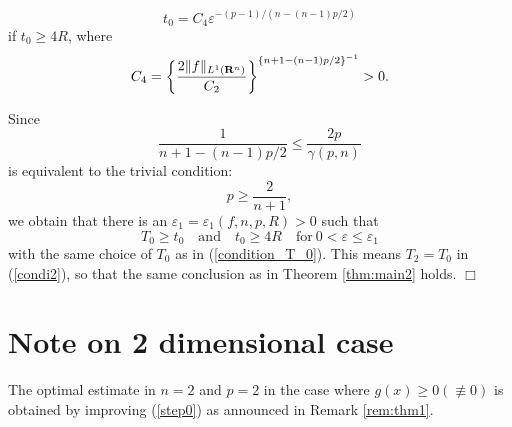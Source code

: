\documentclass[a4paper,12pt]{article}
\numberwithin{equation}{section}
\def\R{{\bf R}}
\def\e{{\varepsilon}}
\begin{document}
\begin{equation}
\label{t_0}
t_0=C_4\e^{-(p-1)/(n-(n-1)p/2)}
\end{equation}
if $t_0\ge4R$, where
\[
C_4=\left\{
\frac{2\|f\|_{L^1(\R^n)}}{C_2}
\right\}^{\left\{n+1-(n-1)p/2\right\}^{-1}}>0.
\]
\par
Since
\[
\frac{1}{n+1-(n-1)p/2}\le\frac{2p}{\gamma(p,n)}
\]
is equivalent to the trivial condition:
\[
p\ge\frac{2}{n+1},
\]
we obtain that there is an $\e_1=\e_1(f,n,p,R)>0$ such that
\[
T_0\ge t_0\quad\mbox{and}\quad t_0\ge4R\quad\mbox{for}\ 0<\e\le\e_1
\]
with the same choice of $T_0$ as in (\ref{condition_T_0}).
This means $T_2=T_0$ in (\ref{condi2}),
so that the same conclusion as in Theorem \ref{thm:main2} holds.
\hfill$\Box$
\section{Note on 2 dimensional case}
\label{section:2d}
The optimal estimate in $n=2$ and $p=2$ in the case where $g(x)\ge0(\not\equiv0)$
is obtained by improving (\ref{step0}) as announced in Remark \ref{rem:thm1}.
 
\end{document}
